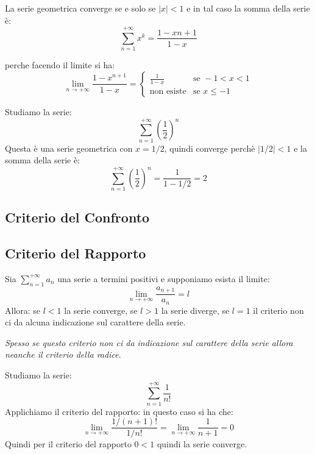     La serie geometrica converge se e solo se $|x| < 1$ e in tal caso la somma della serie è:
    \[ \sum_{n=1}^{+\infty} x^k = \frac{1-x{n+1}}{1-x} \]

    perche facendo il limite si ha:
    \begin{equation}
                \lim_{n \to +\infty} \frac {1-x^{n+1}} {1-x} = \begin{cases}
                    \frac{1}{1-x} & \text{se } -1 < x < 1 \\
                    \text{non esiste} & \text{se } x \leq -1
                \end{cases}
    \end{equation}
    \begin{esempio}
        Studiamo la serie:
            \[ \sum_{n=1}^{+\infty} \left( \frac{1}{2} \right)^n \]
        Questa è una serie geometrica con $x = 1/2$, quindi converge perchè $|1/2| < 1$ e la somma della serie è:
        \[ \sum_{n=1}^{+\infty} \left( \frac{1}{2} \right)^n = \frac{1}{1-1/2} = 2 \]
    \end{esempio}
    \subsection{Criterio del Confronto}





        \subsection{Criterio del Rapporto}
             \begin{definizione}
                    Sia \emph{$\sum_{n=1}^{+\infty}a_n$} una serie a termini positivi e supponiamo esista il limite:
                    \[ \lim_{n \to +\infty} \frac{a_{n+1}}{a_n} = l \]
                    Allora: se $l < 1$ la serie converge, se $l > 1$ la serie diverge, se $l = 1$ il criterio non ci da alcuna indicazione sul carattere della serie.
            \end{definizione}
                    \emph{Spesso se questo criterio non ci da indicazione sul carattere della serie allora neanche il criterio della radice}.
        \begin{esempio}
            Studiamo la serie:
                \[ \sum_{n=1}^{+\infty} \frac{1}{n!} \]
            Applichiamo il criterio del rapporto:
            in questo caso si ha che:
            \begin{equation} \lim_{n \to +\infty} \frac{1/(n+1)!}{1/n!} = \lim_{n \to +\infty} \frac{1}{n+1} = 0
            \end{equation}
            Quindi per il criterio del rapporto $0<1$ quindi la serie converge.
        \end{esempio}
